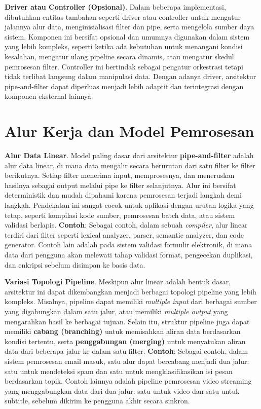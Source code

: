 \textbf{Driver atau Controller (Opsional)}.  
Dalam beberapa implementasi, dibutuhkan entitas tambahan seperti driver atau controller untuk mengatur jalannya alur data, menginisialisasi filter dan pipe, serta mengelola sumber daya sistem. Komponen ini bersifat opsional dan umumnya digunakan dalam sistem yang lebih kompleks, seperti ketika ada kebutuhan untuk menangani kondisi kesalahan, mengatur ulang pipeline secara dinamis, atau mengatur skedul pemrosesan filter. Controller ini bertindak sebagai pengatur orkestrasi tetapi tidak terlibat langsung dalam manipulasi data. Dengan adanya driver, arsitektur pipe-and-filter dapat diperluas menjadi lebih adaptif dan terintegrasi dengan komponen eksternal lainnya.


\section{Alur Kerja dan Model Pemrosesan}

\textbf{Alur Data Linear}.  
Model paling dasar dari arsitektur \textbf{pipe-and-filter} adalah alur data linear, di mana data mengalir secara berurutan dari satu filter ke filter berikutnya. Setiap filter menerima input, memprosesnya, dan meneruskan hasilnya sebagai output melalui pipe ke filter selanjutnya. Alur ini bersifat deterministik dan mudah dipahami karena pemrosesan terjadi langkah demi langkah. Pendekatan ini sangat cocok untuk aplikasi dengan urutan logika yang tetap, seperti kompilasi kode sumber, pemrosesan batch data, atau sistem validasi berlapis.  
\textbf{Contoh}: Sebagai contoh, dalam sebuah \textit{compiler}, alur linear terdiri dari filter seperti lexical analyzer, parser, semantic analyzer, dan code generator. Contoh lain adalah pada sistem validasi formulir elektronik, di mana data dari pengguna akan melewati tahap validasi format, pengecekan duplikasi, dan enkripsi sebelum disimpan ke basis data.

\textbf{Variasi Topologi Pipeline}.  
Meskipun alur linear adalah bentuk dasar, arsitektur ini dapat dikembangkan menjadi berbagai topologi pipeline yang lebih kompleks. Misalnya, pipeline dapat memiliki \textit{multiple input} dari berbagai sumber yang digabungkan dalam satu jalur, atau memiliki \textit{multiple output} yang mengarahkan hasil ke berbagai tujuan. Selain itu, struktur pipeline juga dapat memiliki \textbf{cabang (branching)} untuk memisahkan aliran data berdasarkan kondisi tertentu, serta \textbf{penggabungan (merging)} untuk menyatukan aliran data dari beberapa jalur ke dalam satu filter.  
\textbf{Contoh}: Sebagai contoh, dalam sistem pemrosesan email masuk, satu alur dapat bercabang menjadi dua jalur: satu untuk mendeteksi spam dan satu untuk mengklasifikasikan isi pesan berdasarkan topik. Contoh lainnya adalah pipeline pemrosesan video streaming yang menggabungkan data dari dua jalur: satu untuk video dan satu untuk subtitle, sebelum dikirim ke pengguna akhir secara sinkron.

